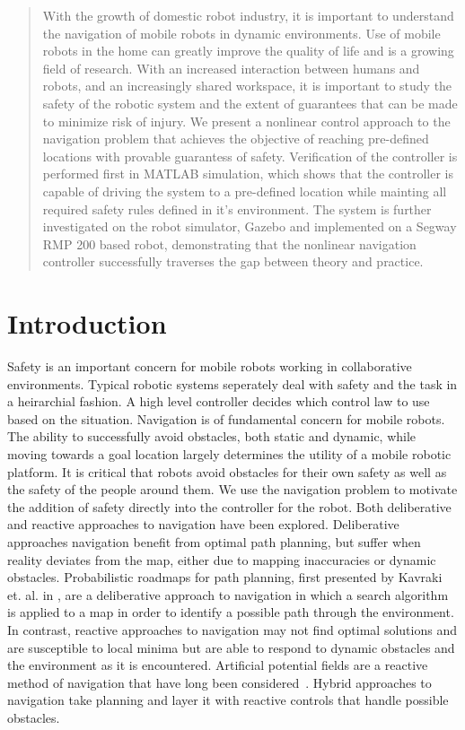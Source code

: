 \documentclass[conference]{IEEEtran}
\begin{document}
\begin{abstract}
With the growth of domestic robot industry, it is important to understand the navigation of mobile robots in dynamic environments. Use of mobile robots in the home can greatly improve the quality of life and is a growing field of research. With an increased interaction between humans and robots, and an increasingly shared workspace, it is important to study the safety of the robotic system and the extent of guarantees that can be made to minimize risk of injury. We present a nonlinear control approach to the navigation problem that achieves the objective of reaching pre-defined locations with provable guarantess of safety. Verification of the controller is performed first in MATLAB simulation, which shows that the controller is capable of driving the system to a pre-defined location while mainting all required safety rules defined in it's environment. The system is further investigated on the robot simulator, Gazebo and implemented on a Segway RMP 200 based robot, demonstrating that the nonlinear navigation controller successfully traverses the gap between theory and practice. 
\end{abstract}

\IEEEpeerreviewmaketitle

\section{Introduction}
Safety is an important concern for mobile robots working in collaborative environments. Typical robotic systems seperately deal with safety and the task in a heirarchial fashion. A high level controller decides which control law to use based on the situation. Navigation is of fundamental concern for mobile robots. The ability to successfully avoid obstacles, both static and dynamic, while moving towards a goal location largely determines the utility of a mobile robotic platform. It is critical that robots avoid obstacles for their own safety as well as the safety of the people around them. We use the navigation problem to motivate the addition of safety directly into the controller for the robot.
Both deliberative and reactive approaches to navigation have been explored. Deliberative approaches navigation benefit from optimal path planning, but suffer when reality deviates from the map, either due to mapping inaccuracies or dynamic obstacles. Probabilistic roadmaps for path planning, first presented by Kavraki et. al. in \cite{kavraki1996}, are a deliberative approach to navigation in which a search algorithm is applied to a map in order to identify a possible path through the environment. In contrast, reactive approaches to navigation may not find optimal solutions and are susceptible to local minima but are able to respond to dynamic obstacles and the environment as it is encountered. Artificial potential fields are a reactive method of navigation that have long been considered~\cite{khatib1985}. Hybrid approaches to navigation take planning and layer it with reactive controls that handle possible obstacles.
\end{document}
